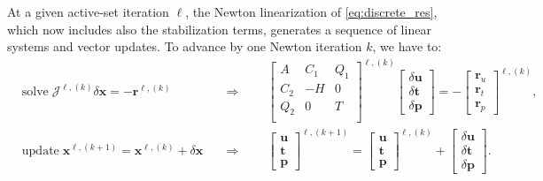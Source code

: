 \documentclass[3p,times]{elsarticle}
\theoremstyle{plain}
\newcommand{\Mat}[1]{#1}
\renewcommand{\Vec}[1]{\mathbf{#1}}
\begin{document}
At a given active-set iteration $\ell$, the Newton linearization of \eqref{eq:discrete_res}, which
now includes also the stabilization terms, generates a sequence of linear
systems and vector updates. To advance by one Newton iteration $k$, we have to:
  \begin{equation}
    \begin{aligned}
      &\text{solve} \; \mathcal{J}^{\ell,(k)} \delta \mathbf{x} = -\mathbf{r}^{\ell,(k)} 
      && \Rightarrow \qquad
      \begin{bmatrix}
        \Mat{A} & \Mat{C}_1 & \Mat{Q}_1 \\
        \Mat{C}_2 & -\Mat{H} & \Mat{0} \\
        \Mat{Q}_2 & \Mat{0} & \Mat{T} \\
      \end{bmatrix}^{\ell,(k)}
      \begin{bmatrix}
        \delta \Vec{u} \\
        \delta \Vec{t} \\
        \delta \Vec{p}
      \end{bmatrix}
      =
      -\begin{bmatrix}
        \Vec{r}_u \\
        \Vec{r}_t \\
        \Vec{r}_p
      \end{bmatrix}^{\ell,(k)}, \\
      &\text{update} \; \mathbf{x}^{\ell,(k+1)} = \mathbf{x}^{\ell,(k)} + \delta \mathbf{x}
      && \Rightarrow \qquad
      \begin{bmatrix}
        \Vec{u} \\
        \Vec{t} \\
        \Vec{p}
      \end{bmatrix}^{\ell,(k+1)}
      =
      \begin{bmatrix}
        \Vec{u} \\
        \Vec{t} \\
        \Vec{p}
      \end{bmatrix}^{\ell,(k)}
      +
      \begin{bmatrix}
        \delta \Vec{u} \\
        \delta \Vec{t} \\
        \delta \Vec{p}
      \end{bmatrix}.
    \end{aligned}
    \label{eq:JacSys}
  \end{equation}
\end{document}
